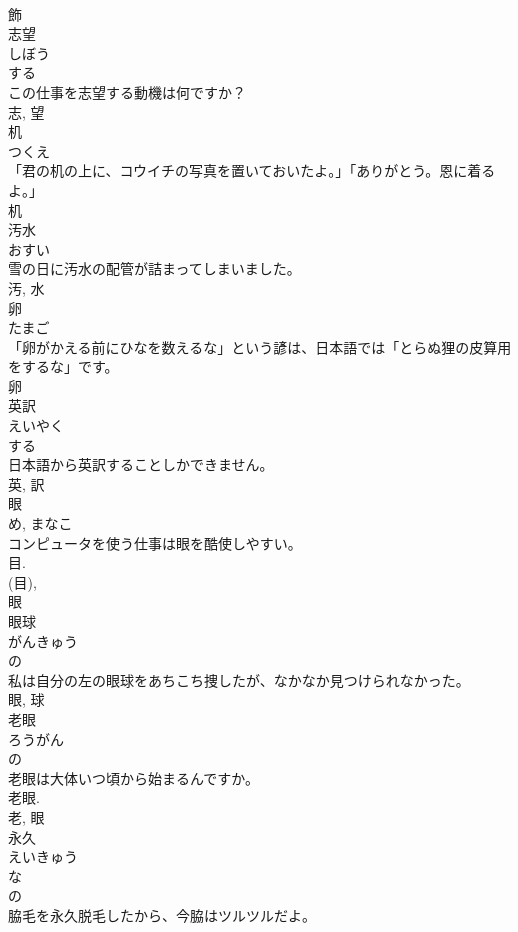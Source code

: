 \documentclass[8pt]{extreport}
\begin{document}
\begin{CJK}{UTF8}{min}
\\	飾	
\\	志望	
\\	しぼう	
\\	する 
\\	この仕事を志望する動機は何ですか？	
\\	志, 望	
\\	机	
\\	つくえ	
\\	「君の机の上に、コウイチの写真を置いておいたよ。」「ありがとう。恩に着るよ。」	
\\	机	
\\	汚水	
\\	おすい	
\\	雪の日に汚水の配管が詰まってしまいました。	
\\	汚, 水	
\\	卵	
\\	たまご	
\\	「卵がかえる前にひなを数えるな」という諺は、日本語では「とらぬ狸の皮算用をするな」です。	
\\	卵	
\\	英訳	
\\	えいやく	
\\	する 
\\	日本語から英訳することしかできません。	
\\	英, 訳	
\\	眼	
\\	め, まなこ	
\\	コンピュータを使う仕事は眼を酷使しやすい。	
\\	目.	
\\	(目), 
\\	眼	
\\	眼球	
\\	がんきゅう	
\\	の 
\\	私は自分の左の眼球をあちこち捜したが、なかなか見つけられなかった。	
\\	眼, 球	
\\	老眼	
\\	ろうがん	
\\	の 
\\	老眼は大体いつ頃から始まるんですか。	
\\	老眼.	
\\	老, 眼	
\\	永久	
\\	えいきゅう	
\\	な 
\\	の 
\\	脇毛を永久脱毛したから、今脇はツルツルだよ。	

\end{CJK}
\end{document}
